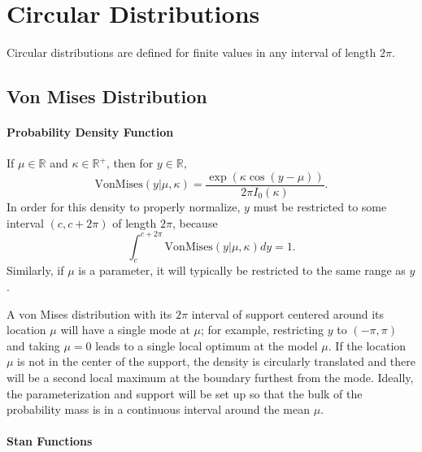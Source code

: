 \begin{description}
\begin{description}    \end{description}


\chapter{Circular Distributions}


Circular distributions are defined for finite values  in any interval of length $2\pi$.


\section{Von Mises Distribution}


\subsubsection{Probability Density Function}


If $\mu \in \mathbb{R}$ and $\kappa \in \mathbb{R}^+$, then for $y \in \mathbb{R}$, \[ \text{VonMises}(y|\mu,\kappa) = \frac{\exp(\kappa\cos(y-\mu))}{2\pi I_0(\kappa)} \!. \] In order for this density to properly normalize, $y$ must be restricted to some interval  $(c, c + 2\pi)$ of length $2 \pi$, because \[ \int_{c}^{c + 2\pi} \text{VonMises}(y|\mu,\kappa) dy = 1. \] Similarly, if $\mu$ is a parameter, it will typically be restricted to the same range as $y$.


A von Mises distribution with its $2 \pi$ interval of support centered around its location $\mu$ will have a single mode at $\mu$; for example, restricting $y$ to $(-\pi,\pi)$ and taking $\mu = 0$ leads to a single local optimum at the model $\mu$.  If the location $\mu$ is not in the center of the support, the density is circularly translated and there will be a second local maximum at the boundary furthest from the mode.  Ideally, the parameterization and support will be set up so that the bulk of the probability mass is in a continuous interval around the mean $\mu$.




\subsubsection{Stan Functions}



\end{description}
